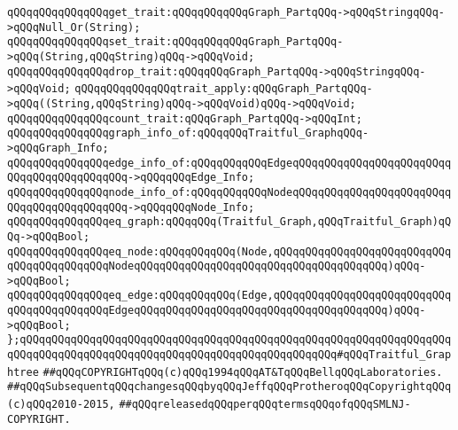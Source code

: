 \newline
\verb|qQQqqQQqqQQqqQQqget_trait:qQQqqQQqqQQqGraph_PartqQQq->qQQqStringqQQq->qQQqNull_Or(String);|\newline
\verb|qQQqqQQqqQQqqQQqset_trait:qQQqqQQqqQQqGraph_PartqQQq->qQQq(String,qQQqString)qQQq->qQQqVoid;|\newline
\verb|qQQqqQQqqQQqqQQqdrop_trait:qQQqqQQqGraph_PartqQQq->qQQqStringqQQq->qQQqVoid;|\newline
\verb|qQQqqQQqqQQqqQQqtrait_apply:qQQqGraph_PartqQQq->qQQq((String,qQQqString)qQQq->qQQqVoid)qQQq->qQQqVoid;|\newline
\verb|qQQqqQQqqQQqqQQqcount_trait:qQQqGraph_PartqQQq->qQQqInt;|\newline
\newline
\verb|qQQqqQQqqQQqqQQqgraph_info_of:qQQqqQQqTraitful_GraphqQQq->qQQqGraph_Info;|\newline
\verb|qQQqqQQqqQQqqQQqedge_info_of:qQQqqQQqqQQqEdgeqQQqqQQqqQQqqQQqqQQqqQQqqQQqqQQqqQQqqQQqqQQq->qQQqqQQqEdge_Info;|\newline
\verb|qQQqqQQqqQQqqQQqnode_info_of:qQQqqQQqqQQqNodeqQQqqQQqqQQqqQQqqQQqqQQqqQQqqQQqqQQqqQQqqQQq->qQQqqQQqNode_Info;|\newline
\newline
\verb|qQQqqQQqqQQqqQQqeq_graph:qQQqqQQq(Traitful_Graph,qQQqTraitful_Graph)qQQq->qQQqBool;|\newline
\verb|qQQqqQQqqQQqqQQqeq_node:qQQqqQQqqQQq(Node,qQQqqQQqqQQqqQQqqQQqqQQqqQQqqQQqqQQqqQQqqQQqNodeqQQqqQQqqQQqqQQqqQQqqQQqqQQqqQQqqQQqqQQq)qQQq->qQQqBool;|\newline
\verb|qQQqqQQqqQQqqQQqeq_edge:qQQqqQQqqQQq(Edge,qQQqqQQqqQQqqQQqqQQqqQQqqQQqqQQqqQQqqQQqqQQqEdgeqQQqqQQqqQQqqQQqqQQqqQQqqQQqqQQqqQQqqQQq)qQQq->qQQqBool;|\newline
\newline
\verb|};qQQqqQQqqQQqqQQqqQQqqQQqqQQqqQQqqQQqqQQqqQQqqQQqqQQqqQQqqQQqqQQqqQQqqQQqqQQqqQQqqQQqqQQqqQQqqQQqqQQqqQQqqQQqqQQqqQQqqQQq#qQQqTraitful_Graphtree|\newline
\newline
\newline
\newline
\verb|##qQQqCOPYRIGHTqQQq(c)qQQq1994qQQqAT&TqQQqBellqQQqLaboratories.|\newline
\verb|##qQQqSubsequentqQQqchangesqQQqbyqQQqJeffqQQqProtheroqQQqCopyrightqQQq(c)qQQq2010-2015,|\newline
\verb|##qQQqreleasedqQQqperqQQqtermsqQQqofqQQqSMLNJ-COPYRIGHT.|\newline

